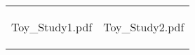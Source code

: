 \documentclass{article}
\begin{document}
\begin{tabular}{cc}
\begin{tikzonimage}[trim=2.75cm 2cm 2cm 2cm, clip=TRUE]{Toy_Study1.pdf}
\end{tikzonimage} & 
\begin{tikzonimage}[trim=4.8cm 2cm 4cm 2cm, clip=TRUE]{Toy_Study2.pdf}
\end{tikzonimage}
\end{tabular}
\end{document}

